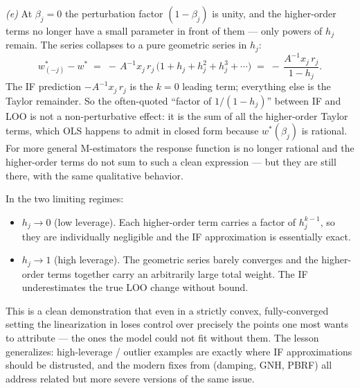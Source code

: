 \documentclass[11pt]{article}
\begin{document}
\begin{solution}[ex:ols-if]
\textit{(e)} At $\beta_j = 0$ the perturbation factor $(1-\beta_j)$ is unity, and the higher-order terms no longer have a small parameter in front of them --- only powers of $h_j$ remain. The series collapses to a pure geometric series in $h_j$:
\[
  w^*_{(-j)} - w^* \;=\; -\,A^{-1} x_j\,r_j\,\bigl(1 + h_j + h_j^{2} + h_j^{3} + \cdots\bigr) \;=\; -\,\frac{A^{-1} x_j\,r_j}{1 - h_j}.
\]
The IF prediction $-A^{-1} x_j\,r_j$ is the $k=0$ leading term; everything else is the Taylor remainder. So the often-quoted ``factor of $1/(1-h_j)$'' between IF and LOO is not a non-perturbative effect: it is the sum of all the higher-order Taylor terms, which OLS happens to admit in closed form because $w^*(\beta_j)$ is rational. For more general M-estimators the response function is no longer rational and the higher-order terms do not sum to such a clean expression --- but they are still there, with the same qualitative behavior.

In the two limiting regimes:
\begin{itemize}
  \item $h_j \to 0$ (low leverage). Each higher-order term carries a factor of $h_j^{k-1}$, so they are individually negligible and the IF approximation is essentially exact.
  \item $h_j \to 1$ (high leverage). The geometric series barely converges and the higher-order terms together carry an arbitrarily large total weight. The IF underestimates the true LOO change without bound.
\end{itemize}
This is a clean demonstration that even in a strictly convex, fully-converged setting the linearization in  loses control over precisely the points one most wants to attribute --- the ones the model could not fit without them. The lesson generalizes: high-leverage / outlier examples are exactly where IF approximations should be distrusted, and the modern fixes from  (damping, GNH, PBRF) all address related but more severe versions of the same issue.

\end{solution}
\end{document}
